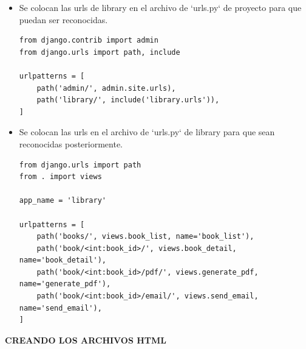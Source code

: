 \documentclass{article}
\begin{document}
\begin{itemize}

\item Se colocan las urls de library en el archivo de `urls.py` de proyecto para que puedan ser reconocidas.

\begin{lstlisting}[style=python]
from django.contrib import admin
from django.urls import path, include

urlpatterns = [
    path('admin/', admin.site.urls),
    path('library/', include('library.urls')),
]
\end{lstlisting}

\item Se colocan las urls en el archivo de `urls.py` de library para que sean reconocidas posteriormente.

\begin{lstlisting}[style=python]
from django.urls import path
from . import views

app_name = 'library'

urlpatterns = [
    path('books/', views.book_list, name='book_list'),
    path('book/<int:book_id>/', views.book_detail, name='book_detail'),
    path('book/<int:book_id>/pdf/', views.generate_pdf, name='generate_pdf'),
    path('book/<int:book_id>/email/', views.send_email, name='send_email'),
]
\end{lstlisting}

\end{itemize}


\vspace{2\baselineskip}

\textbf{CREANDO LOS ARCHIVOS HTML}

\vspace{\baselineskip}
\end{document}
